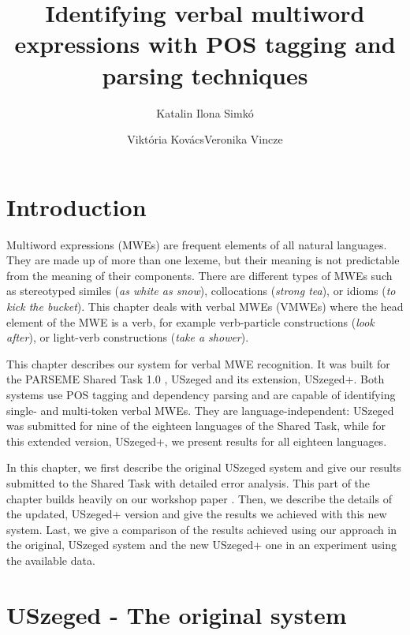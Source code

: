 \documentclass[output=paper,modfonts]{langscibook}
\title{Identifying verbal multiword expressions with POS tagging and parsing techniques}
\author{ Katalin Ilona Simkó\affiliation{University of Szeged}\and  Viktória Kovács\affiliation{University of Szeged}\lastand  Veronika Vincze\affiliation{University of Szeged\\MTA-SZTE Research Group on Artificial Intelligence}}
\begin{document}


\maketitle
\label{SIMKO-CHAPTER}

\section{Introduction} 
Multiword expressions (MWEs) are frequent elements of all natural languages. They are made up of more than one lexeme, but their meaning is not predictable from the meaning of their components. There are different types of MWEs such as stereotyped similes (\textit{as white as snow}), collocations (\textit{strong tea}), or idioms (\textit{to kick the bucket}). This chapter deals with verbal MWEs (VMWEs) where the head element of the MWE is a verb, for example verb-particle constructions (\textit{look after}), or light-verb constructions (\textit{take a shower}). 

This chapter describes our system for verbal MWE recognition. It was built for the PARSEME Shared Task 1.0 \citep{MWEWorkshop}, USzeged
and its extension, USzeged+. Both systems use POS tagging and dependency parsing and are capable of identifying single- and multi-token verbal MWEs. They are language-independent: USzeged was submitted for nine of the eighteen languages of the Shared Task, while for this extended version, USzeged+, we present results for all eighteen languages. 

In this chapter, we first describe the original USzeged system and give our results submitted to the Shared Task with detailed error analysis. This part of the chapter builds heavily on our workshop paper \citep{Simko2017}. Then, we describe the details of the updated, USzeged+ version and give the results we achieved with this new system. Last, we give a comparison of the results achieved using our approach in the original, USzeged system and the new USzeged+ one in an experiment using the available  data.

\section{USzeged - The original system}
\end{document}
